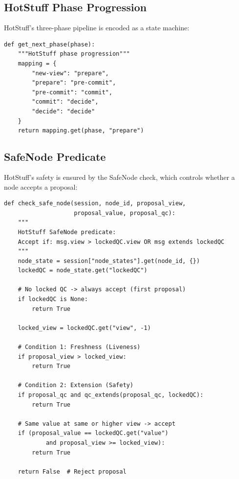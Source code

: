 \documentclass[12pt,a4paper]{article}
\begin{document}
\subsection{HotStuff Phase Progression}

HotStuff's three-phase pipeline is encoded as a state machine:

\begin{lstlisting}[caption={Phase state machine (\texttt{consensus\_engine.py})}, label=lst:phase]
def get_next_phase(phase):
    """HotStuff phase progression"""
    mapping = {
        "new-view": "prepare",
        "prepare": "pre-commit",
        "pre-commit": "commit",
        "commit": "decide",
        "decide": "decide"
    }
    return mapping.get(phase, "prepare")
\end{lstlisting}

\subsection{SafeNode Predicate}

HotStuff's safety is ensured by the SafeNode check, which controls whether a node accepts a proposal:

\begin{lstlisting}[caption={SafeNode predicate (\texttt{consensus\_engine.py})}, label=lst:safenode]
def check_safe_node(session, node_id, proposal_view,
                    proposal_value, proposal_qc):
    """
    HotStuff SafeNode predicate:
    Accept if: msg.view > lockedQC.view OR msg extends lockedQC
    """
    node_state = session["node_states"].get(node_id, {})
    lockedQC = node_state.get("lockedQC")

    # No locked QC -> always accept (first proposal)
    if lockedQC is None:
        return True

    locked_view = lockedQC.get("view", -1)

    # Condition 1: Freshness (Liveness)
    if proposal_view > locked_view:
        return True

    # Condition 2: Extension (Safety)
    if proposal_qc and qc_extends(proposal_qc, lockedQC):
        return True

    # Same value at same or higher view -> accept
    if (proposal_value == lockedQC.get("value")
            and proposal_view >= locked_view):
        return True

    return False  # Reject proposal
\end{lstlisting}
\end{document}
